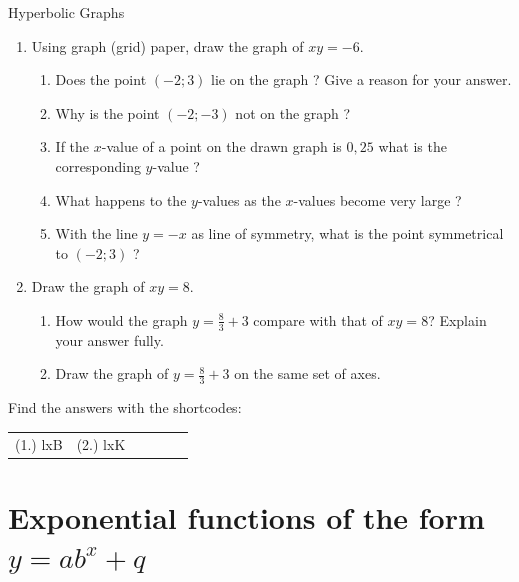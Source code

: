 \begin{exercises}{Hyperbolic Graphs }
{
\begin{enumerate}[noitemsep, label=\textbf{\arabic*}. ] 
\item Using graph (grid) paper, draw the graph of $xy=-6$.
    \begin{enumerate}[noitemsep, label=\textbf{\alph*}. ] 
    \item Does the point $(-2; 3)$ lie on the graph ? Give a reason for your answer.
    \item Why is the point $(-2; -3)$ not on the graph ?
    \item If the $x$-value of a point on the drawn graph is $0,25$ what is the corresponding $y$-value ?
    \item What happens to the $y$-values as the $x$-values become very large ?
    \item With the line $y=-x$ as line of symmetry, what is the point symmetrical to $(-2; 3)$ ?
    \end{enumerate}
\item Draw the graph of $xy=8$.
    \begin{enumerate}[noitemsep, label=\textbf{\alph*}. ] 
    \item How would the graph $y=\frac{8}{3}+3$ compare with that of $xy=8$? Explain your answer fully.
    \item Draw the graph of $y=\frac{8}{3}+3$ on the same set of axes.
    \end{enumerate}
\end{enumerate}

\par {} Find the answers with the shortcodes:
\par \begin{tabular}[h]{cccccc}
(1.) lxB  &  (2.) lxK  & \end{tabular}
}
\end{exercises}

\section{Exponential functions of the form $y=ab^{x}+q$}

